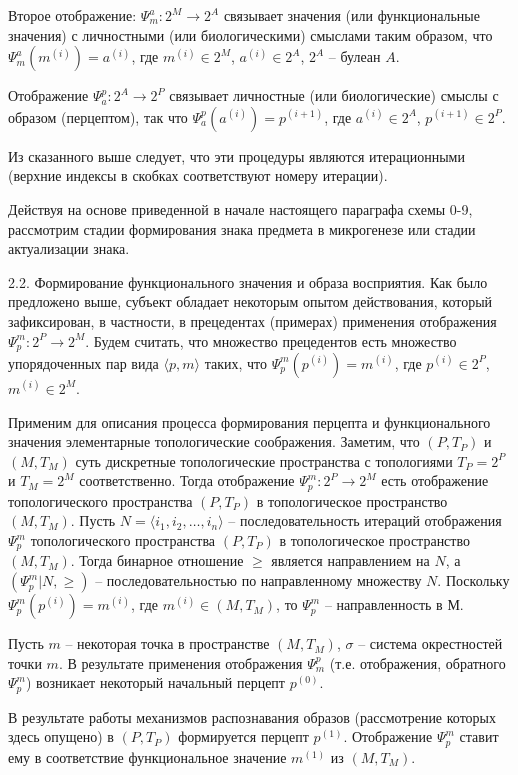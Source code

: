 Второе отображение: $\Psi_m^a:2^M\rightarrow 2^A$ связывает значения (или функциональные значения) с личностными (или биологическими) смыслами таким образом, что $\Psi_m^a(m^{(i)})=a^{(i)}$, где $m^{(i)}\in 2^M$, $a^{(i)}\in 2^A$, $2^A$ – булеан $A$.

Отображение $\Psi_a^p:2^A\rightarrow 2^P$ связывает личностные (или биологические) смыслы с образом (перцептом), так что $\Psi_a^p(a^{(i)})=p^{(i+1)}$, где $a^{(i)}\in 2^A$, $p^{(i+1)}\in 2^P$.

Из сказанного выше следует, что эти процедуры являются итерационными (верхние индексы в скобках соответствуют номеру итерации).

Действуя на основе приведенной в начале настоящего параграфа схемы 0-9, рассмотрим стадии формирования знака предмета в микрогенезе или стадии актуализации знака.

2.2. Формирование функционального значения и образа восприятия. Как было предложено выше, субъект обладает некоторым опытом действования, который зафиксирован, в частности, в прецедентах (примерах) применения отображения $\Psi_p^m:2^P\rightarrow 2^M$. Будем считать, что множество прецедентов есть множество упорядоченных пар вида $\langle p,m\rangle$ таких, что $\Psi_p^m(p^{(i)})=m^{(i)}$, где $p^{(i)}\in 2^P$, $m^{(i)}\in 2^M$.

Применим для описания процесса формирования перцепта и функционального значения элементарные топологические соображения. Заметим, что $(P, T_P)$ и $(M, T_M)$ суть дискретные топологические пространства с топологиями $T_P=2^P$ и $T_M=2^M$ соответственно. Тогда отображение $\Psi_p^m: 2^P\rightarrow 2^M$ есть отображение топологического пространства $(P, T_P)$ в топологическое пространство $(M, T_M)$. Пусть $N=\langle i_1,i_2,\dots,i_n\rangle$ – последовательность итераций отображения $\Psi_p^m$ топологического пространства $(P, T_P)$ в топологическое пространство $(M, T_M)$. Тогда бинарное отношение $\geqslant$ является направлением на $N$, а $(\Psi_p^m | N, \geqslant)$ – последовательностью по направленному множеству $N$. Поскольку $\Psi_p^m(p^{(i)})=m^{(i)}$, где $m^{(i)}\in (M,T_M)$, то $\Psi_p^m$  – направленность в $М$.

Пусть $m$ – некоторая точка в пространстве $(M,T_M)$, $\sigma$ – система окрестностей точки $m$. В результате применения отображения $\Psi_m^p$ (т.е. отображения, обратного $\Psi_p^m$) возникает некоторый начальный перцепт $p^{(0)}$.

В результате работы механизмов распознавания образов (рассмотрение которых здесь опущено) в $(P,T_P)$ формируется перцепт $p^{(1)}$. Отображение $\Psi_p^m$ ставит ему в соответствие функциональное значение $m^{(1)}$ из $(M,T_M)$.

